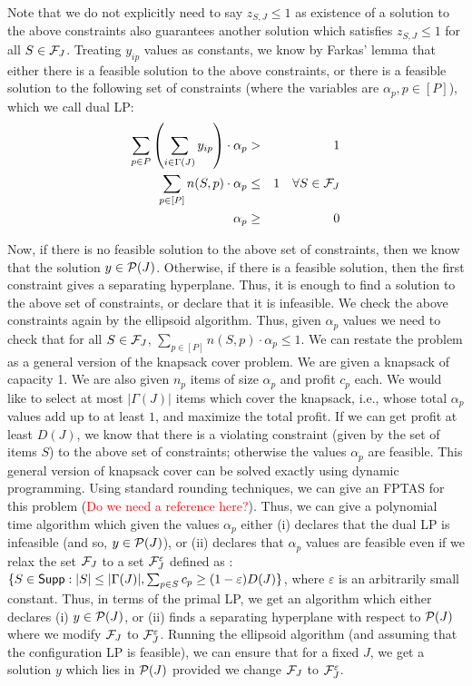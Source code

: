Note that we do not explicitly need to say $z_{S,J} \leq 1$ as existence of a solution to the above constraints also guarantees another solution
which satisfies $z_{S,J} \leq 1$ for all $S \in {\cal F}_J$. Treating $y_{ip}$ values as constants, we know by Farkas' lemma that either there is a feasible solution to
the above constraints, or there is a feasible solution to the following set of constraints (where the variables are $\alpha_p, p \in [P]$),
which we call dual LP:
 \begin{eqnarray}
\sum_{p \in P} \left( \sum_{i \in \Gamma(J)} y_{ip} \right) \cdot  \alpha_p & > & 1 \\
\label{eq:ellipsoid1}
 \sum_{p \in [P]} n(S,p) \cdot \alpha_p & \leq & 1 \ \ \ \forall S \in {\cal F}_J \\
 \label{eq:ellipsoid2}
\alpha_p & \geq & 0
\end{eqnarray}

Now, if there is no feasible solution to the above set of constraints, then we know that the solution $y \in {\cal P}(J)$. Otherwise, if there is a
feasible solution, then the first constraint  gives a separating hyperplane. Thus, it is enough to find a solution to the above set of constraints, or
declare that it is infeasible. We check the above constraints again by the ellipsoid algorithm. Thus, given $\alpha_p$ values we need to check that
for all $S \in {\cal F}_J$, $\sum_{p \in [P]} n(S,p) \cdot \alpha_p \leq 1$. We can restate the  problem as a general version of the knapsack cover
problem. We are given a knapsack of capacity 1. We are also given $n_p$ items of size $\alpha_p$ and profit $c_p$ each. We would like to 
select at most $|\Gamma(J)|$ items which cover  the knapsack, i.e., whose total $\alpha_p$ values add up to at least $1$, and maximize the 
total profit. If we can get profit at least $D(J)$, we know that there is a violating constraint (given by the set of items $S$)  to the above set 
of constraints; otherwise the values $\alpha_p$ are feasible. This general version of knapsack cover can be solved exactly using dynamic programming. 
Using standard rounding techniques, we can give an FPTAS for this problem (\textcolor{red}{Do we need a reference here?}). Thus, we can give a polynomial
time algorithm which given the values $\alpha_p$ either (i) declares that the dual LP is infeasible (and so, $y \in {\cal P}(J)$), or (ii) declares that 
$\alpha_p$ values are feasible even if  we relax the  set ${\cal F}_J$ to a set ${\cal F}_J^\varepsilon$ defined as : $\{S\in \mathsf{Supp}: |S| \leq |\Gamma(J)|, \sum_{p\in S} c_p \geq (1- \varepsilon) D(J)\}$, where $\varepsilon$ is an arbitrarily small constant. Thus, in terms of the primal LP, 
we get an algorithm which either declares (i) $y \in {\cal P}(J)$, or (ii) finds a separating hyperplane with respect to ${\cal P}(J)$ where we modify ${\cal F}_J$ to 
${\cal F}_J^\varepsilon$. Running the ellipsoid algorithm (and assuming that the configuration LP is feasible), we can ensure that for a fixed $J$, 
we get a solution $y$ which lies in ${\cal P}(J)$ provided we change ${\cal F}_J$ to ${\cal F}_J^\varepsilon$. 


